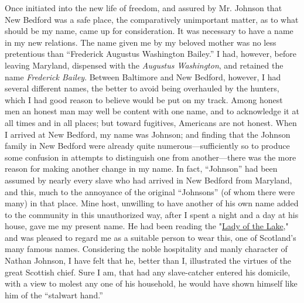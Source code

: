 Once initiated into the new life of freedom, and assured by Mr. Johnson
that New Bedford was a safe place, the comparatively unimportant matter,
as to what should be my name, came up for consideration. It was
necessary to have a name in my new relations. The name given me by my
beloved mother was no less pretentious than ``Frederick Augustus
Washington Bailey.'' I had, however, before leaving Maryland, dispensed
with the \emph{Augustus Washington}, and retained the name
\emph{Frederick Bailey}. Between Baltimore and New Bedford, however, I
had several different names, the better to avoid being overhauled by the
hunters, which I had good reason to believe would be put on my track.
Among honest men an honest man may well be content with one name, and to
acknowledge it at all times and in all places; but toward fugitives,
Americans are not {\protect\hypertarget{343}{}{}}honest. When I arrived
at New Bedford, my name was Johnson; and finding that the Johnson family
in New Bedford were already quite numerous---sufficiently so to produce
some confusion in attempts to distinguish one from another---there was
the more reason for making another change in my name. In fact,
``Johnson'' had been assumed by nearly every slave who had arrived in
New Bedford from Maryland, and this, much to the annoyance of the
original ``Johnsons'' (of whom there were many) in that place. Mine
host, unwilling to have another of his own name added to the community
in this unauthorized way, after I spent a night and a day at his house,
gave me my present name. He had been reading the
"\href{/wiki/The_Lady_of_the_Lake}{Lady of the Lake}," and was pleased
to regard me as a suitable person to wear this, one of Scotland's many
famous names. Considering the noble hospitality and manly character of
Nathan Johnson, I have felt that he, better than I, illustrated the
virtues of the great Scottish chief. Sure I am, that had any
slave-catcher entered his domicile, with a view to molest any one of his
household, he would have shown himself like him of the ``stalwart
hand.''

